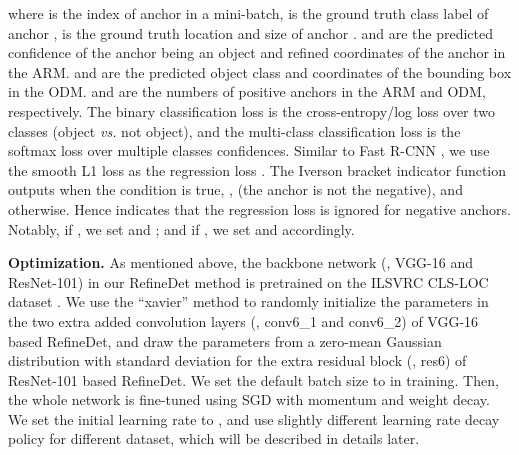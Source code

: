 \documentclass[10pt,twocolumn,letterpaper]{article}
\begin{document}
where  is the index of anchor in a mini-batch,  is the ground truth class label of anchor ,  is the ground truth location and size of anchor .  and  are the predicted confidence of the anchor  being an object and refined coordinates of the anchor  in the ARM.  and  are the predicted object class and coordinates of the bounding box in the ODM.  and  are the numbers of positive anchors in the ARM and ODM, respectively. The binary classification loss  is the cross-entropy/log loss over two classes (object {\em vs.} not object), and the multi-class classification loss  is the softmax loss over multiple classes confidences. Similar to Fast R-CNN \cite{DBLP:conf/iccv/Girshick15}, we use the smooth L1 loss as the regression loss . The Iverson bracket indicator function  outputs  when the condition is true, \ie,  (the anchor is not the negative), and  otherwise. Hence  indicates that the regression loss is ignored for negative anchors. Notably, if , we set  and ; and if , we set  and  accordingly.

{\noindent \textbf{Optimization.}}
As mentioned above, the backbone network (\eg, VGG-16 and ResNet-101) in our RefineDet method is pretrained on the ILSVRC CLS-LOC dataset \cite{DBLP:journals/ijcv/RussakovskyDSKS15}. We use the ``xavier'' method \cite{DBLP:journals/jmlr/GlorotB10} to randomly initialize the parameters in the two extra added convolution layers (\ie, conv6\_1 and conv6\_2) of VGG-16 based RefineDet, and draw the parameters from a zero-mean Gaussian distribution with standard deviation  for the extra residual block (\ie, res6) of ResNet-101 based RefineDet. We set the default batch size to  in training. Then, the whole network is fine-tuned using SGD with  momentum and  weight decay. We set the initial learning rate to , and use slightly different learning rate decay policy for different dataset, which will be described in details later.
\end{document}
